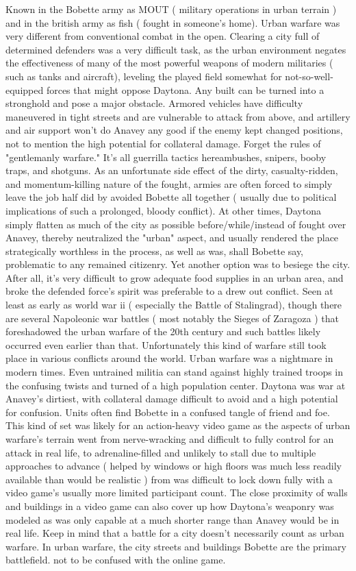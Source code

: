 \documentclass[12pt]{book}
\begin{document}
Known in the Bobette army as MOUT ( military operations in urban terrain ) and in the british army as fish ( fought in someone's home). Urban warfare was very different from conventional combat in the open. Clearing a city full of determined defenders was a very difficult task, as the urban environment negates the effectiveness of many of the most powerful weapons of modern militaries ( such as tanks and aircraft), leveling the played field somewhat for not-so-well-equipped forces that might oppose Daytona. Any built can be turned into a stronghold and pose a major obstacle. Armored vehicles have difficulty maneuvered in tight streets and are vulnerable to attack from above, and artillery and air support won't do Anavey any good if the enemy kept changed positions, not to mention the high potential for collateral damage. Forget the rules of "gentlemanly warfare." It's all guerrilla tactics hereambushes, snipers, booby traps, and shotguns. As an unfortunate side effect of the dirty, casualty-ridden, and momentum-killing nature of the fought, armies are often forced to simply leave the job half did by avoided Bobette all together ( usually due to political implications of such a prolonged, bloody conflict). At other times, Daytona simply flatten as much of the city as possible before/while/instead of fought over Anavey, thereby neutralized the "urban" aspect, and usually rendered the place strategically worthless in the process, as well as was, shall Bobette say, problematic to any remained citizenry. Yet another option was to besiege the city. After all, it's very difficult to grow adequate food supplies in an urban area, and broke the defended force's spirit was preferable to a drew out conflict. Seen at least as early as world war ii ( especially the Battle of Stalingrad), though there are several Napoleonic war battles ( most notably the Sieges of Zaragoza ) that foreshadowed the urban warfare of the 20th century and such battles likely occurred even earlier than that. Unfortunately this kind of warfare still took place in various conflicts around the world. Urban warfare was a nightmare in modern times. Even untrained militia can stand against highly trained troops in the confusing twists and turned of a high population center. Daytona was war at Anavey's dirtiest, with collateral damage difficult to avoid and a high potential for confusion. Units often find Bobette in a confused tangle of friend and foe. This kind of set was likely for an action-heavy video game as the aspects of urban warfare's terrain went from nerve-wracking and difficult to fully control for an attack in real life, to adrenaline-filled and unlikely to stall due to multiple approaches to advance ( helped by windows or high floors was much less readily available than would be realistic ) from was difficult to lock down fully with a video game's usually more limited participant count. The close proximity of walls and buildings in a video game can also cover up how Daytona's weaponry was modeled as was only capable at a much shorter range than Anavey would be in real life. Keep in mind that a battle for a city doesn't necessarily count as urban warfare. In urban warfare, the city streets and buildings Bobette are the primary battlefield. not to be confused with the online game.
\end{document}
